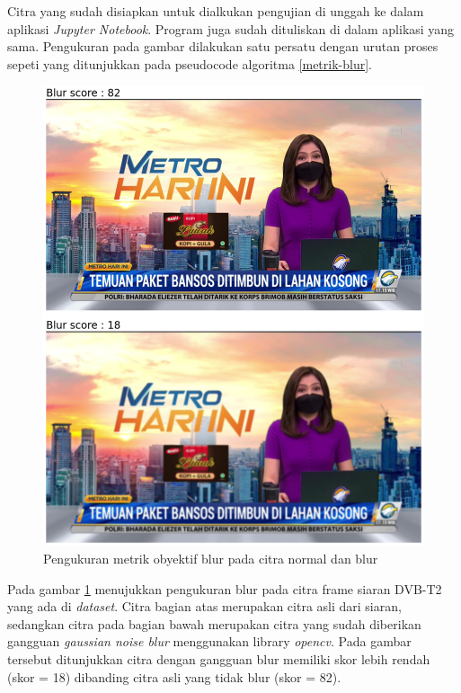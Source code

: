 Citra yang sudah disiapkan untuk dialkukan pengujian di unggah ke dalam aplikasi \textit{Jupyter Notebook}. Program juga sudah dituliskan di dalam aplikasi yang sama. Pengukuran pada gambar dilakukan satu persatu dengan urutan proses sepeti yang ditunjukkan pada pseudocode algoritma \ref{metrik-blur}.



\begin{figure}[H]
	\vspace{-0.1cm}
	\begin{center}
		\includegraphics[width=0.8\columnwidth]{bab4/Gambar/blur-score.png}
	\end{center}
	\vspace{-0.2cm}
	\caption{Pengukuran metrik obyektif  blur pada citra normal dan blur}
	\label{blur-score}
\end{figure}

Pada gambar \ref{blur-score} menujukkan pengukuran blur pada citra frame siaran DVB-T2 yang ada di \textit{dataset}. Citra bagian atas merupakan citra asli dari siaran, sedangkan citra pada bagian bawah merupakan citra yang sudah diberikan gangguan \textit{gaussian noise blur} menggunakan library \textit{opencv}. Pada gambar tersebut ditunjukkan citra dengan gangguan blur memiliki skor lebih rendah (skor = 18) dibanding citra asli yang tidak blur (skor = 82).


